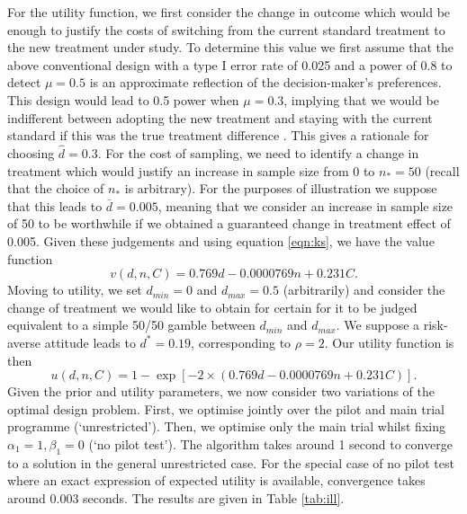 \documentclass[sagev, Crown]{sagej}
\begin{document}
For the utility function, we first consider the change in outcome which would be enough to justify the costs of switching from the current standard treatment to the new treatment under study. To determine this value we first assume that the above conventional design with a type I error rate of 0.025 and a power of 0.8 to detect $\mu = 0.5$ is an approximate reflection of the decision-maker's preferences. This design would lead to 0.5 power when $\mu = 0.3$, implying that we would be indifferent between adopting the new treatment and staying with the current standard if this was the true treatment difference \cite{Willan2005}. This gives a rationale for choosing $\hat{d} = 0.3$. For the cost of sampling, we need to identify a change in treatment which would justify an increase in sample size from 0 to $n_* = 50$ (recall that the choice of $n_*$ is arbitrary). For the purposes of illustration we suppose that this leads to $\bar{d} = 0.005$, meaning that we consider an increase in sample size of 50 to be worthwhile if we obtained a guaranteed change in treatment effect of 0.005. %
Given these judgements and using equation \ref{eqn:ks}, we have the value function
$$ 
v(d, n, C) = 0.769 d - 0.0000769 n + 0.231 C.
$$
Moving to utility, we set $d_{min} = 0$ and $d_{max} = 0.5$ (arbitrarily) and consider the change of treatment we would like to obtain for certain for it to be judged equivalent to a simple 50/50 gamble between $d_{min}$ and $d_{max}$. We suppose a risk-averse attitude leads to $d^* = 0.19$, corresponding to $\rho = 2$. Our utility function is then
$$
u(d, n, C) = 1 - \exp[ - 2 \times (0.769 d - 0.0000769 n + 0.231 C)].
$$
Given the prior and utility parameters, we now consider two variations of the optimal design problem. First, we optimise jointly over the pilot and main trial programme (`unrestricted'). Then, we optimise only the main trial whilst fixing $\alpha_1 = 1, \beta_1 = 0$ (`no pilot test'). The algorithm takes around 1 second to converge to a solution in the general unrestricted case. For the special case of no pilot test where an exact expression of expected utility is available, convergence takes around 0.003 seconds. The results are given in Table \ref{tab:ill}. 
\end{document}

